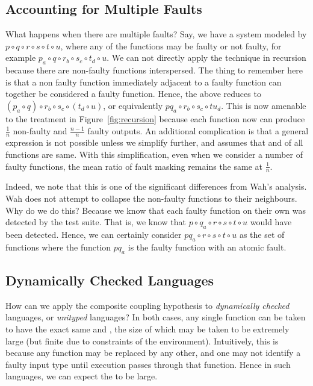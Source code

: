 \documentclass[preprint,nonatbib]{sigplanconf}\usepackage[]{graphicx}\usepackage[]{color}
\begin{document}
\subsection{Accounting for Multiple Faults}
What happens when there are multiple faults? Say, we have a system modeled by
$p \circ q \circ r \circ s \circ t \circ u$, where any of the functions may be
faulty or not faulty, for example
$p_a \circ q \circ r_b \circ s_c \circ t_d \circ u$. We can not directly apply
the technique in recursion because there are non-faulty functions interspersed.
The thing to remember here is that a non faulty function immediately adjacent to
a faulty function can together be considered a faulty function. Hence, the above
reduces to $(p_a \circ q) \circ r_b \circ s_c \circ (t_d \circ u)$, or equivalently
$pq_a \circ r_b \circ s_c \circ tu_d$. This is now
amenable to the treatment in Figure~\ref{fig:recursion} because each function
now can produce $\frac{1}{n}$ non-faulty and $\frac{n-1}{n}$ faulty outputs. An
additional complication is that a general expression is not possible unless we
simplify further, and assumes that \finput and \foutput of all functions are same. 
With this simplification, even when we consider a number of faulty functions,
the mean ratio of fault masking remains the same at $\frac{1}{n}$.

Indeed, we note that this is one of the significant differences from Wah's
analysis. Wah does not attempt to collapse the non-faulty functions to their
neighbours. Why do we do this? Because we know that each faulty function on
their own was detected by the test suite. That is, we know that
$p \circ q_a \circ r \circ s \circ t \circ u$ would have been detected.
Hence, we can certainly consider $pq_a \circ r \circ s \circ t \circ u$ as
the set of functions where the function $pq_a$ is the faulty function with
an atomic fault.

\subsection{Dynamically Checked Languages}

How can we apply the composite coupling hypothesis to \emph{dynamically checked}
languages, or \emph{unityped} languages? In both cases, any single function can
be taken to have the exact same \finput and \finput, the size of which may be
taken to be extremely large (but finite due to constraints of the environment).
Intuitively, this is because any function may be replaced by any other, and
one may not identify a faulty input type until execution passes through that
function. Hence in such languages, we can expect the \kappaT to be large.
\end{document}

